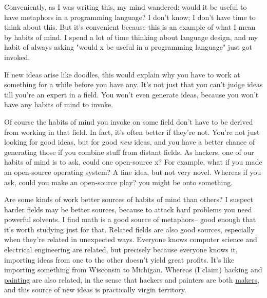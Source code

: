 Conveniently, as I was writing
                    this, my mind wandered: would it be useful to have metaphors
                    in a programming language? I don't know; I don't have time
                    to think about this. But it's convenient because this is an
                    example of what I mean by habits of mind. I spend a lot of
                    time thinking about language design, and my habit of always
                    asking "would x be useful in a programming language" just
                    got invoked.

If new ideas arise like doodles,
                    this would explain why you have to work at something for a
                    while before you have any. It's not just that you can't
                    judge ideas till you're an expert in a field. You won't even
                    generate ideas, because you won't have any habits of mind to
                    invoke.

Of course the habits of mind you invoke
                    on some field don't have to be derived from working in that
                    field. In fact, it's often better if they're not. You're not
                    just looking for good ideas, but for good \emph{new} ideas,
                    and you have a better chance of generating those if you
                    combine stuff from distant fields. As hackers, one of our
                    habits of mind is to ask, could one open-source x? For
                    example, what if you made an open-source operating system? A
                    fine idea, but not very novel. Whereas if you ask, could you
                    make an open-source play? you might be onto something.

Are
                    some kinds of work better sources of habits of mind than
                    others? I suspect harder fields may be better sources,
                    because to attack hard problems you need powerful solvents.
                    I find math is a good source of metaphors-- good enough that
                    it's worth studying just for that. Related fields are also
                    good sources, especially when they're related in unexpected
                    ways. Everyone knows computer science and electrical
                    engineering are related, but precisely because everyone
                    knows it, importing ideas from one to the other doesn't
                    yield great profits. It's like importing something from
                    Wisconsin to Michigan. Whereas (I claim) hacking and
                    \href{http://www.paulgraham.com/hp.html}{painting} are also related, in the
                    sense that hackers and painters are both
                    \href{http://www.paulgraham.com/taste.html}{makers}, and this source of new
                    ideas is practically virgin territory.


